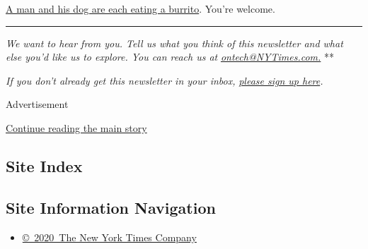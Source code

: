 \href{https://twitter.com/DannyDeraney/status/1284883502844874752}{A man
and his dog are each eating a burrito}. You're welcome.

\begin{center}\rule{0.5\linewidth}{\linethickness}\end{center}

\emph{We want to hear from you. Tell us what you think of this
newsletter and what else you'd like us to explore. You can reach us at}
\href{mailto:ontech@NYTimes.com?subject=On\%20Tech\%20Feedback}{\emph{ontech@NYTimes.com.}}
**

\emph{If you don't already get this newsletter in your inbox,}
\href{https://www.nytimes3xbfgragh.onion/newsletters/signup/OT}{\emph{please
sign up here}}\emph{.}

Advertisement

\protect\hyperlink{after-bottom}{Continue reading the main story}

\hypertarget{site-index}{%
\subsection{Site Index}\label{site-index}}

\hypertarget{site-information-navigation}{%
\subsection{Site Information
Navigation}\label{site-information-navigation}}

\begin{itemize}
\tightlist
\item
  \href{https://help.nytimes3xbfgragh.onion/hc/en-us/articles/115014792127-Copyright-notice}{©~2020~The
  New York Times Company}
\end{itemize}

